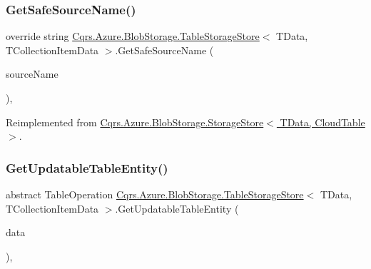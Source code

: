 \subsubsection{\texorpdfstring{Get\+Safe\+Source\+Name()}{GetSafeSourceName()}}
{\footnotesize\ttfamily override string \hyperlink{classCqrs_1_1Azure_1_1BlobStorage_1_1TableStorageStore}{Cqrs.\+Azure.\+Blob\+Storage.\+Table\+Storage\+Store}$<$ T\+Data, T\+Collection\+Item\+Data $>$.Get\+Safe\+Source\+Name (\begin{DoxyParamCaption}\item[{string}]{source\+Name }\end{DoxyParamCaption})\hspace{0.3cm}{\ttfamily [protected]}, {\ttfamily [virtual]}}



Reimplemented from \hyperlink{classCqrs_1_1Azure_1_1BlobStorage_1_1StorageStore_a3ed119d808d9b29e99b1c6c983831482_a3ed119d808d9b29e99b1c6c983831482}{Cqrs.\+Azure.\+Blob\+Storage.\+Storage\+Store$<$ T\+Data, Cloud\+Table $>$}.

\mbox{\label{classCqrs_1_1Azure_1_1BlobStorage_1_1TableStorageStore_a1308b107766a375b7b8dcc92d9080393_a1308b107766a375b7b8dcc92d9080393}} 
\subsubsection{\texorpdfstring{Get\+Updatable\+Table\+Entity()}{GetUpdatableTableEntity()}\hspace{0.1cm}{\footnotesize\ttfamily [1/2]}}
{\footnotesize\ttfamily abstract Table\+Operation \hyperlink{classCqrs_1_1Azure_1_1BlobStorage_1_1TableStorageStore}{Cqrs.\+Azure.\+Blob\+Storage.\+Table\+Storage\+Store}$<$ T\+Data, T\+Collection\+Item\+Data $>$.Get\+Updatable\+Table\+Entity (\begin{DoxyParamCaption}\item[{T\+Collection\+Item\+Data}]{data }\end{DoxyParamCaption})\hspace{0.3cm}{\ttfamily [protected]}, {}}

